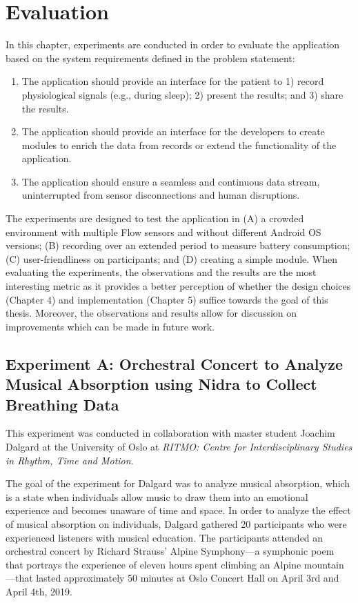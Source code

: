 \chapter{Evaluation}

In this chapter, experiments are conducted in order to evaluate the application based on the system requirements defined in the problem statement: 

\begin{enumerate}
    \item The application should provide an interface for the patient to 1) record physiological signals (e.g., during sleep); 2) present the results; and 3) share the results.
    \item The application should provide an interface for the developers to create modules to enrich the data from records or extend the functionality of the application. 
    \item The application should ensure a seamless and continuous data stream, uninterrupted from sensor disconnections and human disruptions.
\end{enumerate}

The experiments are designed to test the application in (A) a crowded environment with multiple Flow sensors and without different Android OS versions; (B) recording over an extended period to measure battery consumption; (C) user-friendliness on participants; and (D) creating a simple module. When evaluating the experiments, the observations and the results are the most interesting metric as it provides a better perception of whether the design choices (Chapter 4) and implementation (Chapter 5) suffice towards the goal of this thesis. Moreover, the observations and results allow for discussion on improvements which can be made in future work.  


\section{Experiment A: Orchestral Concert to Analyze Musical Absorption using Nidra to Collect Breathing Data}
This experiment was conducted in collaboration with master student Joachim Dalgard at the University of Oslo at \textit{RITMO: Centre for Interdisciplinary Studies in Rhythm, Time and Motion}. 

The goal of the experiment for Dalgard was to analyze musical absorption, which is a state when individuals allow music to draw them into an emotional experience and becomes unaware of time and space. In order to analyze the effect of musical absorption on individuals, Dalgard gathered 20 participants who were experienced listeners with musical education. The participants attended an orchestral concert by Richard Strauss' Alpine Symphony---a symphonic poem that portrays the experience of eleven hours spent climbing an Alpine mountain---that lasted approximately 50 minutes at Oslo Concert Hall on April 3rd and April 4th, 2019.  

